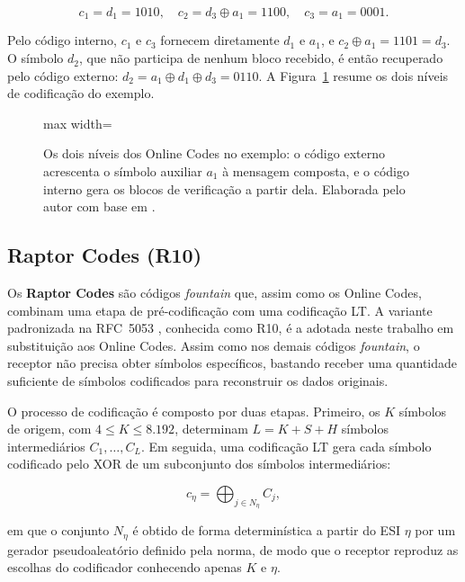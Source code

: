 \begin{equation}
	c_1 = d_1 = 1010, \quad
	c_2 = d_3 \oplus a_1 = 1100, \quad
	c_3 = a_1 = 0001.
\end{equation}

Pelo código interno, $c_1$ e $c_3$ fornecem diretamente $d_1$ e $a_1$, e $c_2 \oplus a_1 = 1101 = d_3$. O símbolo $d_2$, que não participa de nenhum bloco recebido, é então recuperado pelo código externo: $d_2 = a_1 \oplus d_1 \oplus d_3 = 0110$. A Figura~\ref{fig:online_codes} resume os dois níveis de codificação do exemplo.

\begin{figure}[htbp]
	\centering
	\begin{adjustbox}{max width=\textwidth}
		
	\end{adjustbox}
	\caption{Os dois níveis dos Online Codes no exemplo: o código externo acrescenta o símbolo auxiliar $a_1$ à mensagem composta, e o código interno gera os blocos de verificação a partir dela. Elaborada pelo autor com base em \cite{maymounkov2002online}.}
	\label{fig:online_codes}
\end{figure}

\subsection{Raptor Codes (R10)}
\label{sec:raptor_r10}
Os \textbf{Raptor Codes} \cite{shokrollahi2006raptor} são códigos \emph{fountain} que, assim como os Online Codes, combinam uma etapa de pré-codificação com uma codificação LT. A variante padronizada na RFC~5053 \cite{luby2007rfc5053}, conhecida como R10, é a adotada neste trabalho em substituição aos Online Codes. Assim como nos demais códigos \emph{fountain}, o receptor não precisa obter símbolos específicos, bastando receber uma quantidade suficiente de símbolos codificados para reconstruir os dados originais.

O processo de codificação é composto por duas etapas. Primeiro, os $K$ símbolos de origem, com $4 \le K \le 8.192$, determinam $L = K + S + H$ símbolos intermediários $C_1, \ldots, C_L$. Em seguida, uma codificação LT gera cada símbolo codificado pelo XOR de um subconjunto dos símbolos intermediários:

\begin{equation}
c_\eta = \bigoplus_{j \in N_\eta} C_j,
\label{eq:r10_lt}
\end{equation}

\noindent em que o conjunto $N_\eta$ é obtido de forma determinística a partir do \acrshort{ESI} $\eta$ por um gerador pseudoaleatório definido pela norma, de modo que o receptor reproduz as escolhas do codificador conhecendo apenas $K$ e $\eta$.


